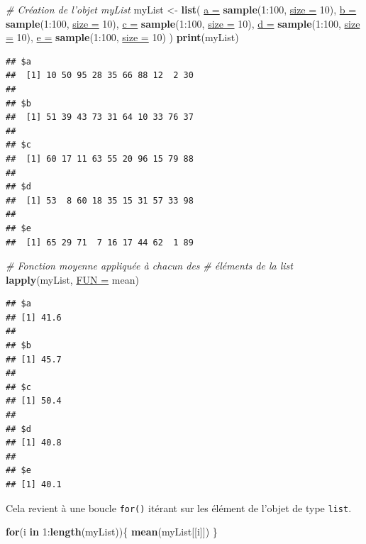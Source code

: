 \documentclass[twoside,symmetric]{book}
\newenvironment{Shaded}{}{}
\newcommand{\CommentTok}[1]{\textit{#1}}
\newcommand{\ControlFlowTok}[1]{\textbf{#1}}
\newcommand{\DataTypeTok}[1]{\underline{#1}}
\newcommand{\DecValTok}[1]{#1}
\newcommand{\KeywordTok}[1]{\textbf{#1}}
\newcommand{\NormalTok}[1]{#1}
\newcommand{\OperatorTok}[1]{#1}
\newcommand{\StringTok}[1]{#1}
\begin{document}
\begin{Shaded}
\begin{Highlighting}[]
\CommentTok{# Création de l'objet myList}
\NormalTok{myList <-}\StringTok{ }\KeywordTok{list}\NormalTok{(}
  \DataTypeTok{a =} \KeywordTok{sample}\NormalTok{(}\DecValTok{1}\OperatorTok{:}\DecValTok{100}\NormalTok{, }\DataTypeTok{size =} \DecValTok{10}\NormalTok{), }
  \DataTypeTok{b =} \KeywordTok{sample}\NormalTok{(}\DecValTok{1}\OperatorTok{:}\DecValTok{100}\NormalTok{, }\DataTypeTok{size =} \DecValTok{10}\NormalTok{), }
  \DataTypeTok{c =} \KeywordTok{sample}\NormalTok{(}\DecValTok{1}\OperatorTok{:}\DecValTok{100}\NormalTok{, }\DataTypeTok{size =} \DecValTok{10}\NormalTok{), }
  \DataTypeTok{d =} \KeywordTok{sample}\NormalTok{(}\DecValTok{1}\OperatorTok{:}\DecValTok{100}\NormalTok{, }\DataTypeTok{size =} \DecValTok{10}\NormalTok{), }
  \DataTypeTok{e =} \KeywordTok{sample}\NormalTok{(}\DecValTok{1}\OperatorTok{:}\DecValTok{100}\NormalTok{, }\DataTypeTok{size =} \DecValTok{10}\NormalTok{)}
\NormalTok{)}
\KeywordTok{print}\NormalTok{(myList)}
\end{Highlighting}
\end{Shaded}

\begin{verbatim}
## $a
##  [1] 10 50 95 28 35 66 88 12  2 30
## 
## $b
##  [1] 51 39 43 73 31 64 10 33 76 37
## 
## $c
##  [1] 60 17 11 63 55 20 96 15 79 88
## 
## $d
##  [1] 53  8 60 18 35 15 31 57 33 98
## 
## $e
##  [1] 65 29 71  7 16 17 44 62  1 89
\end{verbatim}

\begin{Shaded}
\begin{Highlighting}[]
\CommentTok{# Fonction moyenne appliquée à chacun des}
\CommentTok{# éléments de la list}
\KeywordTok{lapply}\NormalTok{(myList, }\DataTypeTok{FUN =}\NormalTok{ mean)}
\end{Highlighting}
\end{Shaded}

\begin{verbatim}
## $a
## [1] 41.6
## 
## $b
## [1] 45.7
## 
## $c
## [1] 50.4
## 
## $d
## [1] 40.8
## 
## $e
## [1] 40.1
\end{verbatim}

Cela revient à une boucle \texttt{for()} itérant sur les élément de l'objet de type \texttt{list}.

\begin{Shaded}
\begin{Highlighting}[]
\ControlFlowTok{for}\NormalTok{(i }\ControlFlowTok{in} \DecValTok{1}\OperatorTok{:}\KeywordTok{length}\NormalTok{(myList))\{}
  \KeywordTok{mean}\NormalTok{(myList[[i]])}
\NormalTok{\}}
\end{Highlighting}
\end{Shaded}
\end{document}
